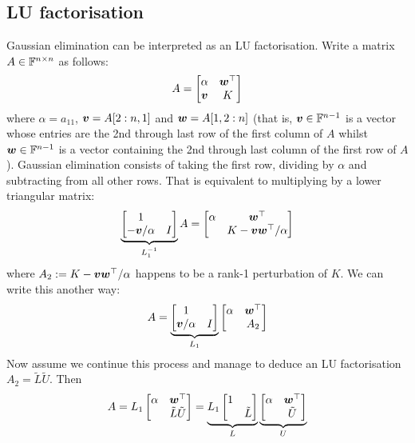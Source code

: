 \subsection{LU factorisation}
Gaussian elimination  can be interpreted as an LU factorisation. Write a matrix $A \in {\mathbb F}^{n \times n}$ as follows:
\[
A =  \begin{bmatrix} \alpha & \bm{{\mbox{\boldmath$w$\unboldmath}}}^\top \\ \bm{{\mbox{\boldmath$v$\unboldmath}}} & K \end{bmatrix}
\]
where $\ensuremath{\alpha} = a_{11}$, $\bm{{\mbox{\boldmath$v$\unboldmath}}} = A[2:n, 1]$ and $\bm{{\mbox{\boldmath$w$\unboldmath}}} = A[1, 2:n]$ (that is, $\bm{{\mbox{\boldmath$v$\unboldmath}}} \in {\mathbb F}^{n-1}$ is a vector whose entries are the 2nd through last row of the first column of $A$ whilst $\bm{{\mbox{\boldmath$w$\unboldmath}}} \in {\mathbb F}^{n-1}$ is a vector containing the 2nd through last column of the first row of $A$). Gaussian elimination consists of taking the first row, dividing by $\ensuremath{\alpha}$ and subtracting from all other rows. That is equivalent to multiplying by a lower triangular matrix:
\[
\underbrace{\begin{bmatrix}
1 \\
-\bm{{\mbox{\boldmath$v$\unboldmath}}}/\alpha & I \end{bmatrix}}_{L_1^{-1}} A = \begin{bmatrix} \alpha & \bm{{\mbox{\boldmath$w$\unboldmath}}}^\top \\  & K -\bm{{\mbox{\boldmath$v$\unboldmath}}}\bm{{\mbox{\boldmath$w$\unboldmath}}}^\top /\alpha \end{bmatrix}
\]
where $A_2 := K -\bm{{\mbox{\boldmath$v$\unboldmath}}}\bm{{\mbox{\boldmath$w$\unboldmath}}}^\top /\alpha$  happens to be a rank-1 perturbation of $K$. We can write this another way:
\[
A = \underbrace{\begin{bmatrix}
1 \\
\bm{{\mbox{\boldmath$v$\unboldmath}}}/\alpha & I \end{bmatrix}}_{L_1}  \begin{bmatrix} \alpha & \bm{{\mbox{\boldmath$w$\unboldmath}}}^\top \\  & A_2 \end{bmatrix}
\]
Now assume we continue this process and manage to deduce an LU factorisation $A_2 = \tilde{L} \tilde{U}$. Then
\[
A = L_1 \begin{bmatrix} \alpha & \bm{{\mbox{\boldmath$w$\unboldmath}}}^\top \\  & \tilde{L} \tilde{U} \end{bmatrix}
= \underbrace{L_1 \begin{bmatrix}
1 \\
 & \tilde{L} \end{bmatrix}}_L  \underbrace{\begin{bmatrix} \alpha & \bm{{\mbox{\boldmath$w$\unboldmath}}}^\top \\  & \tilde{U} \end{bmatrix}}_U
\]
